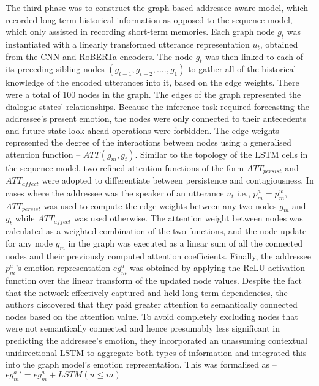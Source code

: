 The third phase was to construct the graph-based addressee aware model, which recorded long-term historical information as opposed to the sequence model, which only assisted in recording short-term memories. Each graph node $g_t$ was instantiated with a linearly transformed utterance representation $u_t$, obtained from the CNN and RoBERTa-encoders. The node $g_t$ was then linked to each of its preceding sibling nodes $(g_{t-1},g_{t-2},....,g_{1})$ to gather all of the historical knowledge of the encoded utterances into it, based on the edge weights. There were a total of 100 nodes in the graph. The edges of the graph represented the dialogue states' relationships. Because the inference task required forecasting the addressee's present emotion, the nodes were only connected to their antecedents and future-state look-ahead operations were forbidden. The edge weights represented the degree of the interactions between nodes using a generalised attention function -- $ATT(g_m,g_t)$. Similar to the topology of the LSTM cells in the sequence model, two refined attention functions of the form $ATT_{persist}$ and $\mathit{ATT_{affect}}$ were adopted to differentiate between persistence and contagiousness. In cases where the addressee was the speaker of an utterance $u_t$ i.e., $p^a_m = p^w_m$, $ATT_{persist}$ was used to compute the edge weights between any two nodes $g_m$ and $g_t$ while $\mathit{ATT_{affect}}$ was used otherwise. The attention weight between nodes was calculated as a weighted combination of the two functions, and the node update for any node $g_m$ in the graph was executed as a linear sum of all the connected nodes and their previously computed attention coefficients. Finally, the addressee $p^a_m$'s emotion representation $eg^a_m$ was obtained by applying the ReLU activation function over the linear transform of the updated node values. Despite the fact that the network effectively captured and held long-term dependencies, the authors discovered that they paid greater attention to semantically connected nodes based on the attention value. To avoid completely excluding nodes that were not semantically connected and hence presumably less significant in predicting the addressee's emotion, they incorporated an unassuming contextual unidirectional LSTM to aggregate both types of information and integrated this into the graph model's emotion representation. This was formalised as -- $eg^a_m′ = eg^a_m + LSTM(u\leq m)$

